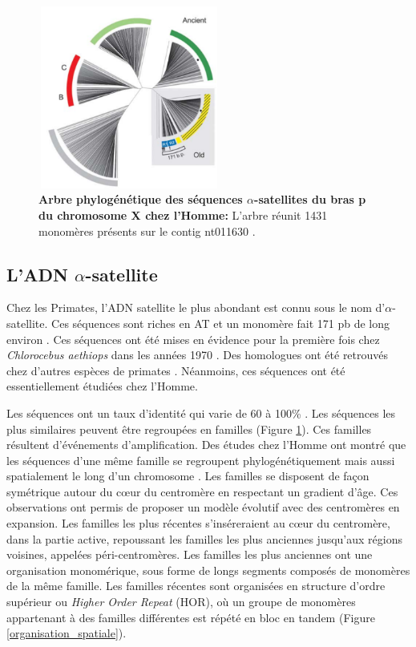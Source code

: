 \documentclass[12pt,a4paper]{article}
\begin{document}
\begin{figure}[!h]
	\center
		\includegraphics[height=6cm, width=6cm]{img/shepelev.png}
		\caption{\textbf{Arbre phylogénétique des séquences $\alpha$-satellites du bras p du chromosome X chez l'Homme:} L’arbre réunit 1431 monomères présents sur le contig nt011630 \cite{Shepelev2009}.\label{shepelev}}
\end{figure}

\subsection{L'ADN $\alpha$-satellite}
Chez les Primates, l'ADN satellite le plus abondant est connu sous le nom d'$\alpha$-satellite. Ces séquences sont riches en AT et un monomère fait 171 pb de long environ \cite{Willard1991}. Ces séquences ont été mises en évidence pour la première fois chez \textit{Chlorocebus aethiops} dans les années 1970 \cite{Kurnit1974}. Des homologues ont été retrouvés chez d’autres espèces de primates \cite{Lee1997}. Néanmoins, ces séquences ont été essentiellement étudiées chez l’Homme.

Les séquences ont un taux d’identité qui varie de  60 à 100\% \cite{Alexandrov2001}. Les séquences les plus similaires peuvent être regroupées en familles (Figure \ref{shepelev}). Ces familles résultent d'événements d'amplification. Des études chez l'Homme ont montré que les séquences d'une même famille se regroupent phylogénétiquement mais aussi spatialement le long d'un chromosome \cite{Shepelev2009}. Les familles se disposent de façon symétrique autour du cœur du centromère en respectant un gradient d'âge.  Ces observations ont permis de proposer un modèle évolutif avec des centromères en expansion. Les familles les plus récentes s’inséreraient au cœur du centromère, dans la partie active, repoussant les familles les plus anciennes jusqu'aux régions voisines, appelées péri-centromères. Les familles les plus anciennes ont une organisation monomérique, sous forme de longs segments composés de monomères de la même famille. Les familles récentes sont organisées en structure d'ordre supérieur ou \textit{Higher Order Repeat} (HOR), où un groupe de monomères appartenant à des familles différentes est répété en bloc en tandem (Figure \ref{organisation_spatiale}).
\end{document}
